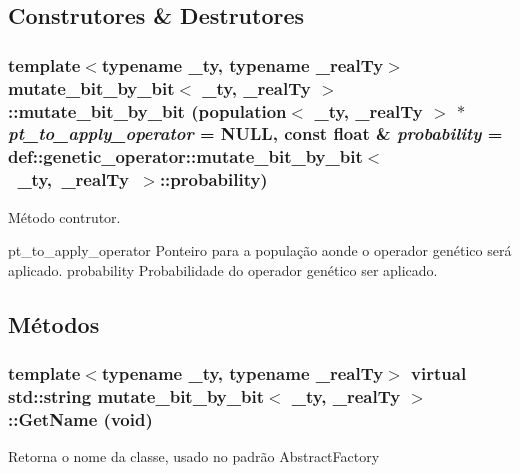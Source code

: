 \subsection{Construtores \& Destrutores}
\hypertarget{classmutate__bit__by__bit_a14de7465518021a37cfa7e06e19d02f5}{
\subsubsection[{mutate\_\-bit\_\-by\_\-bit}]{\setlength{\rightskip}{0pt plus 5cm}template$<$typename \_\-ty, typename \_\-realTy$>$ {\bf mutate\_\-bit\_\-by\_\-bit}$<$ \_\-ty, \_\-realTy $>$::{\bf mutate\_\-bit\_\-by\_\-bit} ({\bf population}$<$ \_\-ty, \_\-realTy $>$ $\ast$ {\em pt\_\-to\_\-apply\_\-operator} = {\ttfamily NULL}, \/  const float \& {\em probability} = {\ttfamily def::genetic\_\-operator::mutate\_\-bit\_\-by\_\-bit$<$~\_\-ty,~\_\-realTy~$>$::probability})}}
\label{classmutate__bit__by__bit_a14de7465518021a37cfa7e06e19d02f5}
Método contrutor.

pt\_\-to\_\-apply\_\-operator Ponteiro para a população aonde o operador genético será aplicado.  probability Probabilidade do operador genético ser aplicado. 

\subsection{Métodos}
\hypertarget{classmutate__bit__by__bit_abdab6da2a2b180f14d71f35c895313a4}{
\subsubsection[{GetName}]{\setlength{\rightskip}{0pt plus 5cm}template$<$typename \_\-ty, typename \_\-realTy$>$ virtual std::string {\bf mutate\_\-bit\_\-by\_\-bit}$<$ \_\-ty, \_\-realTy $>$::GetName (void)}}
\label{classmutate__bit__by__bit_abdab6da2a2b180f14d71f35c895313a4}
Retorna o nome da classe, usado no padrão AbstractFactory

